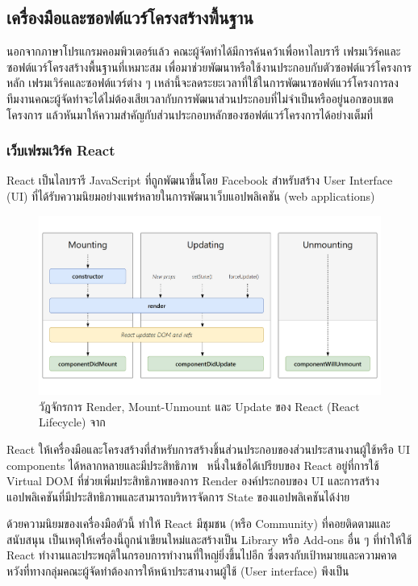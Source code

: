 \documentclass[12pt,one side,openright,a4paper]{cpe-thesis-th}
\newcommand{\thaijustify}[1]{%
  \par\hspace{30pt}\justifying
  #1
}
\begin{document}
\subsection{เครื่องมือและซอฟต์แวร์โครงสร้างพื้นฐาน}
นอกจากภาษาโปรแกรมคอมพิวเตอร์แล้ว คณะผู้จัดทำได้มีการค้นคว้าเพื่อหาไลบรารี เฟรมเวิร์คและซอฟต์แวร์โครงสร้างพื้นฐานที่เหมาะสม เพื่อมาช่วยพัฒนาหรือใช้งานประกอบกับตัวซอฟต์แวร์โครงการหลัก เฟรมเวิร์คและซอฟต์แวร์ต่าง ๆ เหล่านี้จะลดระยะเวลาที่ใช้ในการพัฒนาซอฟต์แวร์โครงการลง ทีมงานคณะผู้จัดทำจะได้ไม่ต้องเสียเวลากับการพัฒนาส่วนประกอบที่ไม่จำเป็นหรืออยู่นอกขอบเขตโครงการ แล้วหันมาให้ความสำคัญกับส่วนประกอบหลักของซอฟต์แวร์โครงการได้อย่างเต็มที่
\subsubsection{เว็บเฟรมเวิร์ค React}
\thaijustify{
  React เป็นไลบรารี JavaScript ที่ถูกพัฒนาขึ้นโดย Facebook สำหรับสร้าง User Interface (UI) ที่ได้รับความนิยมอย่างแพร่หลายในการพัฒนาเว็บแอปพลิเคชัน (web applications)~\cite{flanagan20js}
}
\begin{figure}[H]
  \centering
  \includegraphics[width=12cm]{figure/literature/react-lifecycle.png}
  \caption[วัฏจักรการทำงานของ React]{วัฎจักรการ Render, Mount-Unmount และ Update ของ React (React Lifecycle) จาก~\cite{reactcycles}}\label{fig:lit-react}
\end{figure}
\thaijustify{
  React ให้เครื่องมือและโครงสร้างที่สำหรับการสร้างชิ้นส่วนประกอบของส่วนประสานงานผู้ใช้หรือ UI components ได้หลากหลายและมีประสิทธิภาพ~\cite{crockford08js} หนึ่งในข้อได้เปรียบของ React อยู่ที่การใช้ Virtual DOM ที่ช่วยเพิ่มประสิทธิภาพของการ Render องค์ประกอบของ UI และการสร้างแอปพลิเคชันที่มีประสิทธิภาพและสามารถบริหารจัดการ State ของแอปพลิเคชันได้ง่าย~\cite{flanagan20js}
}
\thaijustify{
  ด้วยความนิยมของเครื่องมือตัวนี้ ทำให้ React มีชุมชน (หรือ Community) ที่คอยติดตามและสนับสนุน เป็นเหตุให้เครื่องนี้ถูกนำเขียนใหม่และสร้างเป็น Library หรือ Add-ons อื่น ๆ ที่ทำให้ใช้ React ทำงานและประพฤติในกรอบการทำงานที่ใหญ่ยิ่งขึ้นไปอีก ซึ่งตรงกับเป้าหมายและความคาดหวังที่ทางกลุ่มคณะผู้จัดทำต้องการให้หน้าประสานงานผู้ใช้ (User interface) พึงเป็น
}
\end{document}
